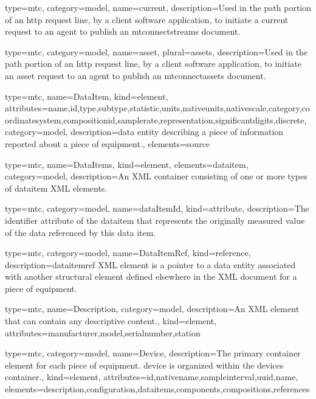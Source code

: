 {
  type=mtc,
  category=model,
  name={current},
  description={Used in the path portion of an \gls{http request line}, by a client software application, to initiate a \gls{current request} to an \gls{agent} to publish an \gls{mtconnectstreams} document.}
}

{
  type=mtc,
  category=model,
  name={asset},
  plural={assets},
  description={Used in the path portion of an \gls{http request line}, by a client software application, to initiate an \gls{asset request} to an \gls{agent} to publish an \gls{mtconnectassets} document.}
}



{
  type=mtc,
  name={DataItem},
  kind={element},
  attributes={\gls{name},\gls{id},\gls{type},\gls{subtype},\gls{statistic},\gls{units},\gls{nativeunits},\gls{nativescale},\gls{category},\gls{coordinatesystem},\gls{compositionid},\gls{samplerate},\gls{representation},\gls{significantdigits},\gls{discrete}},
  category=model,
  description={\gls{data entity} describing a piece of information reported about a piece of equipment.},
  elements={\gls{source}}
}

{
  type=mtc,
  name={DataItems},
  kind={element},
  elements={\gls{dataitem}},
  category=model,
  description={An XML container consisting of one or more types of \gls{dataitem} XML elements.}
}

{
  type=mtc,
  category=model,
  name={dataItemId},
  kind={attribute},
  description={The identifier attribute of the \gls{dataitem} that represents the originally measured value of the data referenced by this data item.}
}


{
  type=mtc,
  category=model,
  name={DataItemRef},
  kind={reference},
  description={\gls{dataitemref} XML element is a pointer to a \gls{data entity} associated with another \gls{structural element} defined elsewhere in the XML document for a piece of equipment.}
}


{
  type=mtc,
  name={Description},
  category=model,
  description={An XML element that can contain any descriptive content.},
  kind={element},
  attributes={\gls{manufacturer},\gls{model},\gls{serialnumber},\gls{station}}
}


{
  type=mtc,
  category=model,
  name={Device},
  description={The primary container element for each piece of equipment. \gls{device} is organized within the \gls{devices}  container.},
  kind={element},
  attributes={\gls{id},\gls{nativename},\gls{sampleinterval},\gls{uuid},\gls{name}},
  elements={\gls{description},\gls{configuration},\gls{dataitems},\gls{components},\glspl{composition},\glspl{reference}}
}

